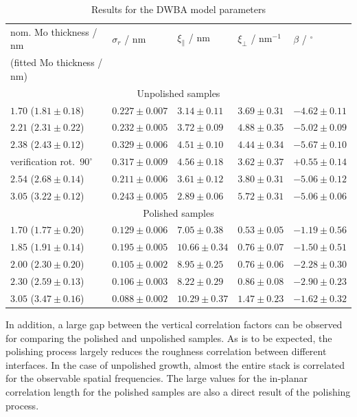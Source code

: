 \begin{table}[htbp]
\centering
\caption{Results for the DWBA model parameters}
\label{tbl:diffuse_parameters_results}
\begin{tabular}{@{}lllll@{}}
\toprule
nom. Mo thickness / nm&$\sigma_r$ / nm & $\xi_\parallel$ / nm & $\xi_\perp$  / nm$^{-1}$ & $\beta$ / $^\circ$ \\ 
(fitted Mo thickness / nm) & & & &\\ \midrule
\multicolumn{5}{c}{Unpolished samples}\\
\midrule
$1.70$ ($1.81 \pm 0.18$) & $0.227 \pm 0.007$ & $3.14 \pm 0.11$ & $3.69 \pm 0.31$ & $-4.62 \pm 0.11$ \\
$2.21$ ($2.31 \pm 0.22$)& $0.232 \pm 0.005$ & $3.72 \pm 0.09$ & $4.88 \pm 0.35$ & $-5.02 \pm 0.09$ \\
$2.38$ ($2.43 \pm 0.12$) & $0.329 \pm 0.006$ & $4.51 \pm 0.10$ & $4.44 \pm 0.34$ & $-5.67 \pm 0.10$ \\
verification rot.~$90^\circ$ & $0.317 \pm 0.009$ & $4.56 \pm 0.18$ & $3.62 \pm 0.37$ & $+0.55 \pm 0.14$ \\
$2.54$ ($2.68 \pm 0.14$)& $0.211 \pm 0.006$ & $3.61 \pm 0.12$ & $3.80 \pm 0.31$ & $-5.06 \pm 0.12$ \\
$3.05$ ($3.22 \pm 0.12$)& $0.243 \pm 0.005$ & $2.89 \pm 0.06$ & $5.72 \pm 0.31$ & $-5.06 \pm 0.06$ \\
\midrule
\multicolumn{5}{c}{Polished samples}\\
\midrule
$1.70$ ($1.77 \pm 0.20$) & $0.129 \pm 0.006$ & $7.05 \pm 0.38$ & $0.53 \pm 0.05$ & $-1.19 \pm 0.56$ \\
$1.85$ ($1.91 \pm 0.14$)& $0.195 \pm 0.005$ & $10.66 \pm 0.34$ & $0.76 \pm 0.07$ & $-1.50 \pm 0.51$ \\
$2.00$ ($2.30 \pm 0.20$)& $0.105 \pm 0.002$ & $8.95 \pm 0.25$ & $0.76 \pm 0.06$ & $-2.28 \pm 0.30$ \\
$2.30$ ($2.59 \pm 0.13$)& $0.106 \pm 0.003$ & $8.22 \pm 0.29$ & $0.86 \pm 0.08$ & $-2.90 \pm 0.23$ \\
$3.05$ ($3.47 \pm 0.16$)& $0.088 \pm 0.002$ & $10.29 \pm 0.37$ & $1.47 \pm 0.23$ & $-1.62 \pm 0.32$ \\
 \bottomrule
\end{tabular}
\end{table}

In addition, a large gap between the vertical correlation factors can be observed for comparing the polished and unpolished samples. As is to be expected, the polishing process largely reduces the roughness correlation between different interfaces. In the case of unpolished growth, almost the entire stack is correlated for the observable spatial frequencies. The large values for the in-planar correlation length for the polished samples are also a direct result of the polishing process. 

